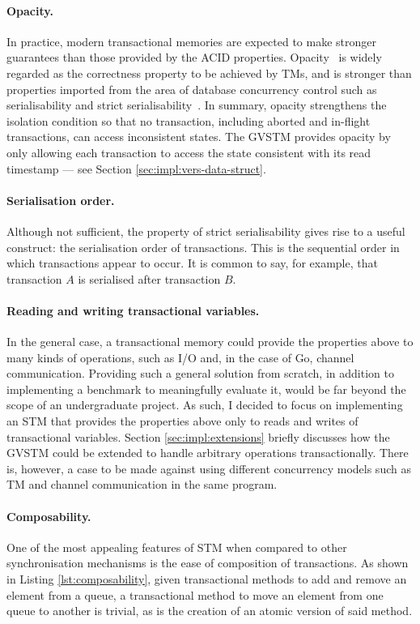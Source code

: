 \documentclass[12pt,a4paper,oneside,openright]{report}
\begin{document}
\paragraph{Opacity.} In practice, modern transactional memories are
expected to make stronger guarantees than those provided by the ACID
properties. Opacity~\cite{Opacity} is widely regarded as the
correctness property to be achieved by TMs, and is stronger than
properties imported from the area of database concurrency control such
as serialisability and strict
serialisability~\cite{Serialisability}. In summary, opacity
strengthens the isolation condition so that no transaction, including
aborted and in-flight transactions, can access inconsistent
states. The GVSTM provides opacity by only allowing each transaction
to access the state consistent with its read timestamp --- see Section
\ref{sec:impl:vers-data-struct}.

\paragraph{Serialisation order.} Although not sufficient, the property
of strict serialisability gives rise to a useful construct: the
serialisation order of transactions. This is the sequential order in
which transactions appear to occur. It is common to say, for example,
that transaction $A$ is serialised after transaction $B$.

\paragraph{Reading and writing transactional variables.} In the
general case, a transactional memory could provide the properties
above to many kinds of operations, such as I/O and, in the case of Go,
channel communication. Providing such a general solution from scratch,
in addition to implementing a benchmark to meaningfully evaluate it,
would be far beyond the scope of an undergraduate project. As such, I
decided to focus on implementing an STM that provides the properties
above only to reads and writes of transactional variables. Section
\ref{sec:impl:extensions} briefly discusses how the GVSTM could be
extended to handle arbitrary operations transactionally. There is,
however, a case to be made against using different concurrency models
such as TM and channel communication in the same program.

\paragraph{Composability.} One of the most appealing features of STM
when compared to other synchronisation mechanisms is the ease of
composition of transactions. As shown in Listing
\ref{lst:composability}, given transactional methods to add and remove
an element from a queue, a transactional method to move an element
from one queue to another is trivial, as is the creation of an atomic
version of said method.
\end{document}
